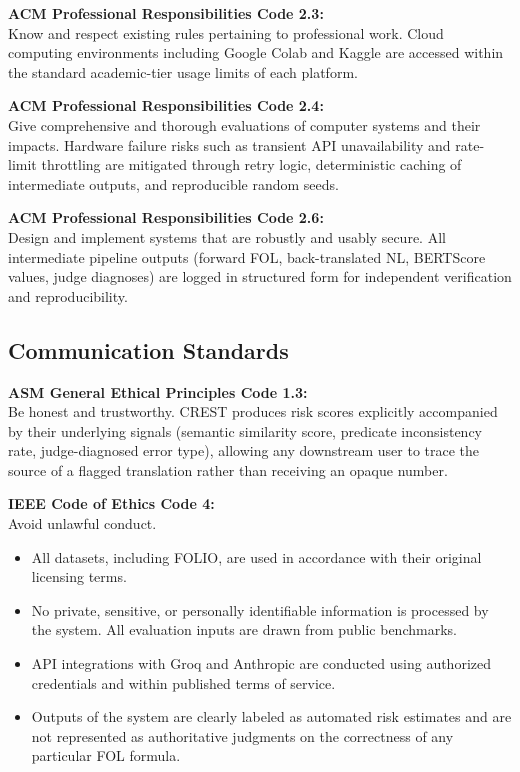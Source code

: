 \textbf{ACM Professional Responsibilities Code 2.3:}\\
Know and respect existing rules pertaining to professional work. Cloud computing environments including Google Colab and Kaggle are accessed within the standard academic-tier usage limits of each platform.

\textbf{ACM Professional Responsibilities Code 2.4:}\\
Give comprehensive and thorough evaluations of computer systems and their impacts. Hardware failure risks such as transient API unavailability and rate-limit throttling are mitigated through retry logic, deterministic caching of intermediate outputs, and reproducible random seeds.

\textbf{ACM Professional Responsibilities Code 2.6:}\\
Design and implement systems that are robustly and usably secure. All intermediate pipeline outputs (forward FOL, back-translated NL, BERTScore values, judge diagnoses) are logged in structured form for independent verification and reproducibility.

\subsection{Communication Standards}

\textbf{ASM General Ethical Principles Code 1.3:}\\
Be honest and trustworthy. CREST produces risk scores explicitly accompanied by their underlying signals (semantic similarity score, predicate inconsistency rate, judge-diagnosed error type), allowing any downstream user to trace the source of a flagged translation rather than receiving an opaque number.

\textbf{IEEE Code of Ethics Code 4:}\\
Avoid unlawful conduct.
\begin{itemize}
    \item All datasets, including FOLIO, are used in accordance with their original licensing terms.
    \item No private, sensitive, or personally identifiable information is processed by the system. All evaluation inputs are drawn from public benchmarks.
    \item API integrations with Groq and Anthropic are conducted using authorized credentials and within published terms of service.
    \item Outputs of the system are clearly labeled as automated risk estimates and are not represented as authoritative judgments on the correctness of any particular FOL formula.
\end{itemize}

